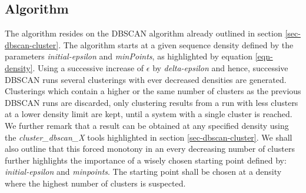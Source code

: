\subsection{Algorithm}

The algorithm resides on the DBSCAN algorithm already outlined in
section \ref{sec-dbscan-cluster}. The algorithm starts at a given
sequence density defined by the parameters \emph{initial-epsilon} and
\emph{minPoints}, as highlighted by equation \ref{eqn-density}. Using
a successive increase of $\epsilon$ by \emph{delta-epsilon} and hence,
successive DBSCAN runs several clusterings with ever decreased
densities are generated. Clusterings which contain a higher or the same
number of clusters as the previous DBSCAN runs are discarded, only
clustering results from a run with less clusters at a lower density
limit are kept,
until a system with a single cluster is reached. We further remark
that a result can be obtained at any specified density using the
\emph{cluster\_dbscan\_X} 
tools highlighted in section \ref{sec-dbscan-cluster}. We shall also
outline that this forced monotony in an every decreasing number of
clusters further highlights the importance of a wisely chosen starting
point defined by:
\emph{initial-epsilon} and \emph{minpoints}. The starting
point shall be chosen at a density where the highest number of
clusters is suspected.

